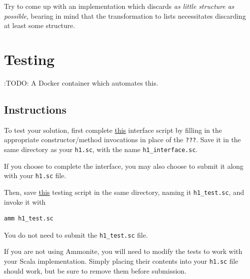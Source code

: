 \documentclass[11pt]{article}
\begin{document}
Try to come up with an implementation
which discards \emph{as little structure as possible},
bearing in mind that the transformation to lists
necessitates discarding at least some structure.
\section*{Testing}
\label{sec:orgf1d89e4}
:TODO: A Docker container which automates this.

\subsection*{Instructions}
\label{sec:orgebc15ed}
To test your solution, first complete
\href{./src/h1\_interface.sc}{this} interface script
by filling in the appropriate constructor/method invocations
in place of the \texttt{???}.
Save it in the same directory as your \texttt{h1.sc},
with the name \texttt{h1\_interface.sc}.

If you choose to complete the interface, you may also
choose to submit it along with your \texttt{h1.sc} file.

Then, save \href{./src/h1\_test.sc}{this} testing script
in the same directory, naming it \texttt{h1\_test.sc}, and invoke it with
\begin{verbatim}
amm h1_test.sc
\end{verbatim}

You do not need to submit the \texttt{h1\_test.sc} file.

If you are not using Ammonite, you will need to modify the tests
to work with your Scala implementation.
Simply placing their contents into your \texttt{h1.sc} file should work,
but be sure to remove them before submission.
\end{document}
